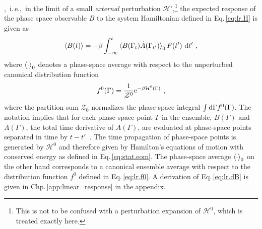,~i.\,e.,~in the limit of a small \emph{external} perturbation $\mathcal H'$,\footnote{This is not to be confused with a perturbation expansion of $\mathcal H^0$, which is treated exactly here.} the expected response of the phase space observable $B$ to the system Hamiltonian defined in Eq.\,\eqref{eq:lr.H} is given as
%
\begin{align}
\braket{B (t)}
    = - \beta \int_{-\infty}^t 
      \braket{B(\Gamma_t) \dot{A} (\Gamma_{t'})}_{0} F(t') ~ \d t'~,
  \label{eq:lr.dB}
\end{align}
%
where $\braket{\cdot}_{0}$ denotes a phase-space average with respect to the unperturbed canonical distribution function
%
\begin{align}
  f^0 (\Gamma) 
    = \frac{1}{\mathcal{Z}^0} {\rm e}^{- \beta \mathcal H^0 (\Gamma)}~,
  \label{eq:lr.f0}
\end{align}
where the partition sum $\mathcal{Z}_0$ normalizes the phase-space integral \mbox{$\int {\rm d} \Gamma f^0 (\Gamma)$}.
The notation implies that for each phase-space point $\Gamma$ in the ensemble, $B (\Gamma)$ and $\dot{A} (\Gamma)$, the total time derivative of $A (\Gamma)$, are evaluated at phase-space points separated in time by $t-t'$~\cite[p.\,498]{Tuckerman}.
The time propagation of phase-space points is generated by $\mathcal H^0$ and therefore given by Hamilton's equations of motion with conserved energy as defined in Eq.\,\eqref{eq:stat.eom}. The phase-space average $\braket{\cdot}_{0}$ on the other hand corresponds to a canonical ensemble average with respect to the distribution function $f^0$ defined in Eq.\,\eqref{eq:lr.f0}. A derivation of Eq.\,\eqref{eq:lr.dB} is given in Chp.\,\ref{app:linear_response} in the appendix.



